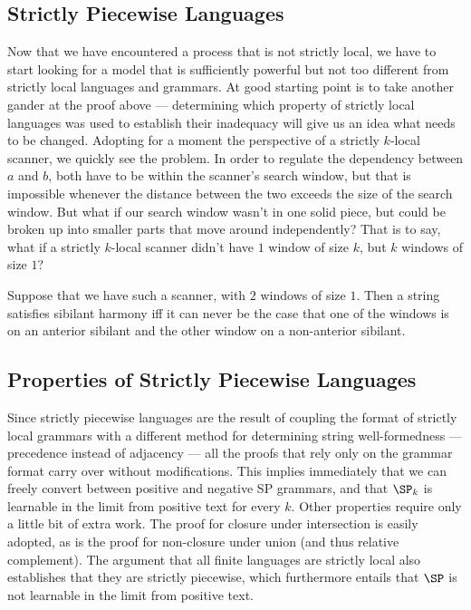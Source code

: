 \subsection{Strictly Piecewise Languages}

Now that we have encountered a process that is not strictly local, we have to start looking for a model that is sufficiently powerful but not too different from strictly local languages and grammars.
At good starting point is to take another gander at the proof above --- determining which property of strictly local languages was used to establish their inadequacy will give us an idea what needs to be changed.
Adopting for a moment the perspective of a strictly $k$-local scanner, we quickly see the problem.
In order to regulate the dependency between $a$ and $b$, both have to be within the scanner's search window, but that is impossible whenever the distance between the two exceeds the size of the search window.
But what if our search window wasn't in one solid piece, but could be broken up into smaller parts that move around independently?
That is to say, what if a strictly $k$-local scanner didn't have $1$ window of size $k$, but $k$ windows of size $1$?

Suppose that we have such a scanner, with $2$ windows of size $1$.
Then a string satisfies sibilant harmony iff it can never be the case that one of the windows is on an anterior sibilant and the other window on a non-anterior sibilant.

\subsection{Properties of Strictly Piecewise Languages}

Since strictly piecewise languages are the result of coupling the format of strictly local grammars with a different method for determining string well-formedness --- precedence instead of adjacency --- all the proofs that rely only on the grammar format carry over without modifications.
This implies immediately that we can freely convert between positive and negative SP grammars, and that $\SP_k$ is learnable in the limit from positive text for every $k$.
Other properties require only a little bit of extra work.
The proof for closure under intersection is easily adopted, as is the proof for non-closure under union (and thus relative complement).
The argument that all finite languages are strictly local also establishes that they are strictly piecewise, which furthermore entails that $\SP$ is not learnable in the limit from positive text.

